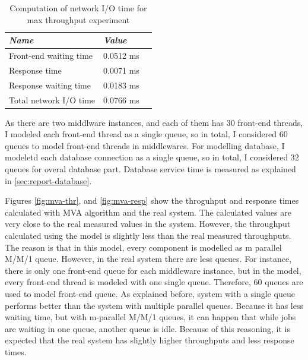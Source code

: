 \documentclass[11pt]{article}
\begin{document}
\begin{table}[!ht]
  \begin{tabular}{*3l}    \toprule
    \emph{Name}   & \emph{Value} \\
    \hline
      Front-end waiting time     & 0.0512 ms \\
      Response time              & 0.0071 ms \\
      Response waiting time      & 0.0183 ms \\ 
      \hline
      Total network I/O time     & 0.0766 ms \\
    \hline
  \end{tabular}
  \centering
  \caption{Computation of network I/O time for max throughput experiment}
  \label{tbl:network-time}
\end{table}

As there are two middlware instances, and each of them has 30 front-end threads, I modeled each front-end thread as a single queue, so in total,
I considered 60 queues to model front-end threads in middlewares. For modelling database,
I modeletd each database connection as a single queue, so in total, I considered 32 queues for 
overal database part. Database service time is measured as explained in \cref{sec:report-database}.


 Figures \ref{fig:mva-thr}, and \ref{fig:mva-resp} show the throguhput and response times 
 calculated with MVA algorithm and the real system. The calculated values are very close to the real 
 measured values in the system. However, the throughput calculated using the model is slightly less than the real measured throughputs.
 The reason is that in this model, every component is modelled as m parallel M/M/1 queue. However, in the 
 real system there are less queues. For instance, there is only one front-end queue for each middleware instance,
 but in the model, every front-end thread is modeled with one single queue. Therefore, 60 queues are used 
 to model front-end queue. As explained before, system with a single queue performs better than the system with 
 multiple parallel queues. Because it has less waiting time, but with m-parallel M/M/1 queues, it can happen that 
 while jobs are waiting in one queue, another queue is idle. Because of this reasoning, it is expected 
 that the real system has slightly higher throughputs and less response times.
 
\end{document}
